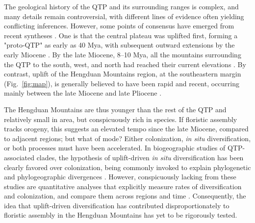 The geological history of the QTP and its surrounding ranges is
complex, and many details remain controversial, with different lines
of evidence often yielding conflicting inferences. However, some
points of consensus have emerged from recent syntheses
\citep{WangC2014,Favre2015,Deng2015,Renner2016}. One is that the
central plateau was uplifted first, forming a "proto-QTP" as early as
40 Mya, with subsequent outward extensions by the early Miocene
\citep{Rowley2006,WangC2014}. By the late Miocene, 8--10 Mya, all the
mountains surrounding the QTP to the south, west, and north had
reached their current elevations
\citep{Spicer2003,Fang2005,WangY2012,Deng2015}. By contrast, uplift of
the Hengduan Mountains region, at the southeastern margin
(Fig.~\ref{fig:map}), is generally believed to have been rapid and
recent, occurring mainly between the late Miocene and late Pliocene
\citep{kirby2002,clark2005,WangE2012,Wang2014,Meng2016,SunB2011}.%

The Hengduan Mountains are thus younger than the rest of the QTP and
relatively small in area, but conspicuously rich in species. If
floristic assembly tracks orogeny, this suggests an elevated tempo
since the late Miocene, compared to adjacent regions; but what of
mode? Either colonization, \textit{in situ} diversification, or both
processes must have been accelerated. In biogeographic studies of
QTP-associated clades, the hypothesis of uplift-driven \textit{in
  situ} diversification has been clearly favored over colonization,
being commonly invoked to explain phylogenetic and phylogeographic
divergences
\citep[e.g.,][]{LiuJ2006,WangY2009,ZhangJ2014,GaoY2013}. However,
conspicuously lacking from these studies are quantitative analyses
that explicitly measure rates of diversification and colonization, and
compare them across regions and time
\citep{Wen2014,Favre2015}. Consequently, the idea that uplift-driven
diversification has contributed disproportionately to floristic
assembly in the Hengduan Mountains has yet to be rigorously tested.



